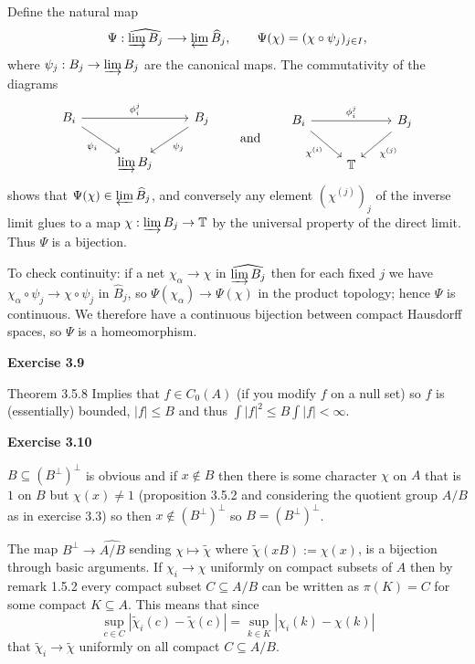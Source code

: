 \documentclass{article}
\begin{document}
Define the natural map
\[
\Psi:\widehat{\varinjlim B_j}\longrightarrow \varprojlim \widehat B_j,\qquad \Psi(\chi)=(\chi\circ\psi_j)_{j\in I},
\]
where $\psi_j:B_j\to\varinjlim B_j$ are the canonical maps. The commutativity of the diagrams
\[
\begin{tikzcd}
B_i \arrow[rr,"\phi_i^j"] \arrow[dr,"\psi_i"'] & & B_j \arrow[dl,"\psi_j"] \\
& \varinjlim B_j &
\end{tikzcd}
\qquad\text{and}\qquad
\begin{tikzcd}
B_i \arrow[rr,"\phi_i^j"] \arrow[dr,"\chi^{(i)}"'] & & B_j \arrow[dl,"\chi^{(j)}"] \\
& \mathbb T &
\end{tikzcd}
\]
shows that $\Psi(\chi)\in\varprojlim\widehat B_j$, and conversely any element $(\chi^{(j)})_{j}$ of the inverse limit glues to a map $\chi:\varinjlim B_j\to\mathbb T$ by the universal property of the direct limit. Thus $\Psi$ is a bijection.

To check continuity: if a net $\chi_\alpha\to\chi$ in $\widehat{\varinjlim B_j}$ then for each fixed $j$ we have $\chi_\alpha\circ\psi_j\to\chi\circ\psi_j$ in $\widehat B_j$, so $\Psi(\chi_\alpha)\to\Psi(\chi)$ in the product topology; hence $\Psi$ is continuous. We therefore have a continuous bijection between compact Hausdorff spaces, so $\Psi$ is a homeomorphism.

\vspace{0.5cm}

\textbf{Exercise 3.9}

\vspace{0.5cm}

Theorem 3.5.8 Implies that $f \in C_0(A)$ (if you modify $f$ on a null set) so $f$ is (essentially) bounded, $|f| \leq B$ and thus $\int |f|^2 \leq B \int |f| < \infty$.

\vspace{0.5cm}

\textbf{Exercise 3.10}

\vspace{0.5cm}

$B \subseteq (B^\perp)^\perp$ is obvious and if $x \not \in B$ then there is some character $\chi$ on $A$ that is $1$ on $B$ but $\chi(x) \neq 1$ (proposition 3.5.2 and considering the quotient group $A/B$ as in exercise 3.3) so then $x\not \in (B^\perp)^\perp$ so $B = (B^\perp)^\perp$.

The map $B^{\perp} \rightarrow \widehat{A/B}$ sending $\chi \mapsto \tilde \chi$ where $\tilde \chi(xB) := \chi(x)$, is a bijection through basic arguments. If $\chi_i \rightarrow \chi$ uniformly on compact subsets of $A$ then by remark 1.5.2 every compact subset $C \subseteq A/B$ can be written as $\pi(K) = C$ for some compact $K \subseteq A$. This means that since $$\sup\limits_{c \in C} |\tilde\chi_i(c) - \tilde\chi(c)| = \sup\limits_{k \in K} |\chi_i(k) - \chi(k)|$$ that $\tilde \chi_i \rightarrow \tilde \chi$ uniformly on all compact $C \subseteq A/B$.
\end{document}
